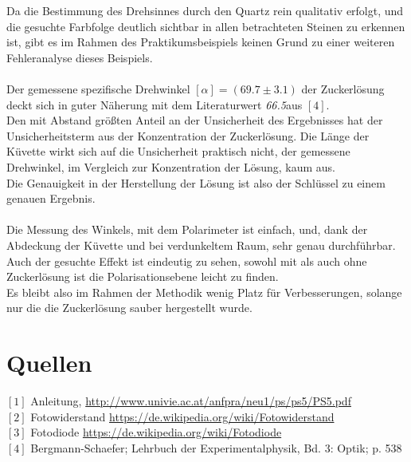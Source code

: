 \documentclass[12pt,a4paper]{article}
\begin{document}
\begin{multicols}{2}
Da die Bestimmung des Drehsinnes durch den Quartz rein qualitativ erfolgt, und die gesuchte Farbfolge deutlich sichtbar in allen betrachteten Steinen zu erkennen ist, gibt es im Rahmen des Praktikumsbeispiels keinen Grund zu einer weiteren Fehleranalyse dieses Beispiels.\\
\\
Der gemessene spezifische Drehwinkel $[\alpha] = (69.7 \pm 3.1)$ der Zuckerlösung deckt sich in guter Näherung mit dem Literaturwert \emph{66.5}aus $[4]$.\\
Den mit Abstand größten Anteil an der Unsicherheit des Ergebnisses hat der Unsicherheitsterm aus der Konzentration der Zuckerlösung. Die Länge der Küvette wirkt sich auf die Unsicherheit praktisch nicht, der gemessene Drehwinkel, im Vergleich zur Konzentration der Lösung, kaum aus.\\
Die Genauigkeit in der Herstellung der Lösung ist also der Schlüssel zu einem genauen Ergebnis.\\
\\
Die Messung des Winkels, mit dem Polarimeter ist einfach, und, dank der Abdeckung der Küvette und bei verdunkeltem Raum, sehr genau durchführbar. Auch der gesuchte Effekt ist eindeutig zu sehen, sowohl mit als auch ohne Zuckerlösung ist die Polarisationsebene leicht zu finden.\\
Es bleibt also im Rahmen der Methodik wenig Platz für Verbesserungen, solange nur die die Zuckerlösung sauber hergestellt wurde.


\section{Quellen}
$[1]$ Anleitung, \url{http://www.univie.ac.at/anfpra/neu1/ps/ps5/PS5.pdf}\\
$[2]$ Fotowiderstand \url{https://de.wikipedia.org/wiki/Fotowiderstand}\\
$[3]$ Fotodiode \url{https://de.wikipedia.org/wiki/Fotodiode}\\
$[4]$ Bergmann-Schaefer; Lehrbuch der Experimentalphysik, Bd. 3: Optik; p. 538\\
\end{multicols}
\end{document}

